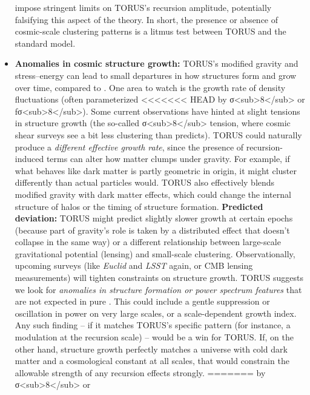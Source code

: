 \documentclass[]{article}
\begin{document}
\begin{itemize}
  impose stringent limits on TORUS's recursion amplitude, potentially
  falsifying this aspect of the theory​. In short, the presence or
  absence of cosmic-scale clustering patterns is a litmus test between
  TORUS and the standard model.
\item
  \textbf{Anomalies in cosmic structure growth:} TORUS's modified
  gravity and stress--energy can lead to small departures in how
  structures form and grow over time, compared to . One area to
  watch is the growth rate of density fluctuations (often parameterized
<<<<<<< HEAD
  by σ\textless sub\textgreater8\textless/sub\textgreater{} or
  fσ\textless sub\textgreater8\textless/sub\textgreater). Some current
  observations have hinted at slight tensions in structure growth (the
  so-called σ\textless sub\textgreater8\textless/sub\textgreater{}
  tension, where cosmic shear surveys see a bit less clustering than
   predicts). TORUS could naturally produce a \emph{different
  effective growth rate}, since the presence of recursion-induced terms
  can alter how matter clumps under gravity. For example, if what
  behaves like dark matter is partly geometric in origin, it might
  cluster differently than actual particles would. TORUS also
  effectively blends modified gravity with dark matter effects, which
  could change the internal structure of halos or the timing of
  structure formation. \textbf{Predicted deviation:} TORUS might predict
  slightly slower growth at certain epochs (because part of gravity's
  role is taken by a distributed effect that doesn't collapse in the
  same way) or a different relationship between large-scale
  gravitational potential (lensing) and small-scale clustering.
  Observationally, upcoming surveys (like \emph{Euclid} and \emph{LSST}
  again, or CMB lensing measurements) will tighten constraints on
  structure growth. TORUS suggests we look for \emph{anomalies in
  structure formation or power spectrum features} that are not expected
  in pure \hspace{0pt}. This could include a gentle suppression or
  oscillation in power on very large scales, or a scale-dependent growth
  index. Any such finding -- if it matches TORUS's specific pattern (for
  instance, a modulation at the recursion scale) -- would be a win for
  TORUS. If, on the other hand, structure growth perfectly matches a
   universe with cold dark matter and a cosmological constant at all
  scales, that would constrain the allowable strength of any recursion
  effects strongly.
=======
  by σ\textless{}sub\textgreater{}8\textless{}/sub\textgreater{} or

\end{itemize}
\end{document}
